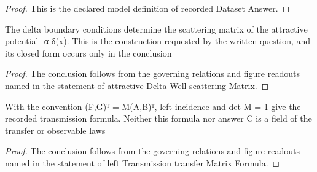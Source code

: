 \begin{proof}
  This is the declared model definition of recorded Dataset Answer.
\end{proof}
\begin{lemma}
  \label{lem:physics:phyx-mini-0601:phyxminiproblems-problemphyxmini0601-attractivedeltawell-scatteringmatrix}
  The delta boundary conditions determine the scattering matrix of the attractive potential -α δ(x). This is the construction requested by the written question, and its closed form occurs only in the conclusion
\end{lemma}
\begin{proof}
  The conclusion follows from the governing relations and figure readouts named in the statement of attractive Delta Well scattering Matrix.
\end{proof}
\begin{lemma}
  \label{lem:physics:phyx-mini-0601:phyxminiproblems-problemphyxmini0601-lefttransmission-transfermatrixformula}
  With the convention (F,G)ᵀ = M(A,B)ᵀ, left incidence and det M = 1 give the recorded transmission formula. Neither this formula nor answer C is a field of the transfer or observable laws
\end{lemma}
\begin{proof}
  The conclusion follows from the governing relations and figure readouts named in the statement of left Transmission transfer Matrix Formula.
\end{proof}
